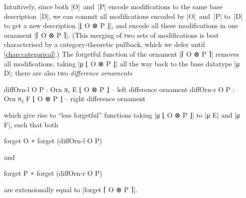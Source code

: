 Intuitively, since both |O|~and~|P| encode modifications to the same base description~|D|, we can commit all modifications encoded by |O|~and~|P| to~|D| to get a new description |⌊ O ⊗ P ⌋|, and encode all these modifications in one ornament |⌈ O ⊗ P ⌉|.
(This merging of two sets of modifications is best characterised by a category-theoretic pullback, which we defer until \autoref{chap:categorical}.)
The forgetful function of the ornament |⌈ O ⊗ P ⌉| removes all modifications, taking |μ ⌊ O ⊗ P ⌋| all the way back to the base datatype |μ D|; there are also two \emph{difference ornaments}
\begin{code}
diffOrn-l  O P : Orn π₁  E  ⌊ O ⊗ P ⌋  -- left difference ornament
diffOrn-r  O P : Orn π₂  F  ⌊ O ⊗ P ⌋  -- right difference ornament
\end{code}
which give rise to ``less forgetful'' functions taking |μ ⌊ O ⊗ P ⌋| to |μ E| and |μ F|, such that both
\savecolumns
\begin{code}
forget O  ∘ forget (diffOrn-l  O P)
\end{code}
and
\restorecolumns
\begin{code}
forget P  ∘ forget (diffOrn-r  O P)
\end{code}
are extensionally equal to |forget ⌈ O ⊗ P ⌉|.


